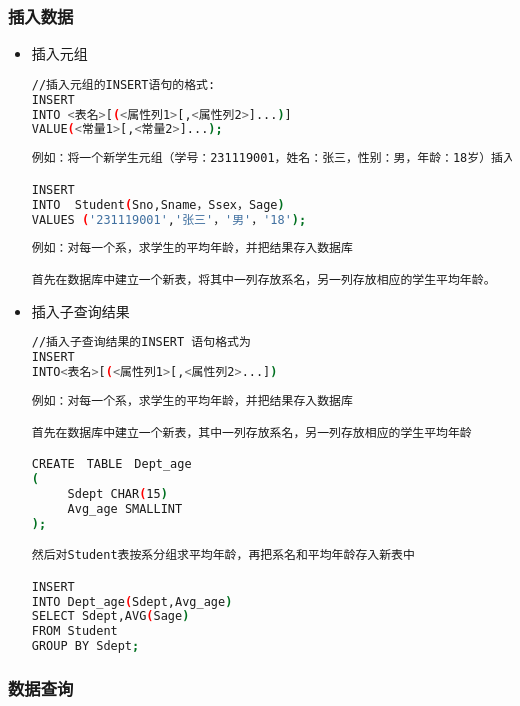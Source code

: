 \subsubsection{插入数据}
\begin{itemize}
\item 插入元组
\begin{lstlisting}[language=bash]
//插入元组的INSERT语句的格式:
INSERT 
INTO <表名>[(<属性列1>[,<属性列2>]...)]
VALUE(<常量1>[,<常量2>]...);
\end{lstlisting}
\begin{lstlisting}[language=bash]
例如：将一个新学生元组（学号：231119001，姓名：张三，性别：男，年龄：18岁）插入到Student表中

INSERT 
INTO  Student(Sno,Sname，Ssex，Sage)
VALUES ('231119001','张三'，'男'，'18');
\end{lstlisting}

\begin{lstlisting}[language=bash]
例如：对每一个系，求学生的平均年龄，并把结果存入数据库

首先在数据库中建立一个新表，将其中一列存放系名，另一列存放相应的学生平均年龄。


\end{lstlisting}
\item 插入子查询结果
\begin{lstlisting}[language=bash]
//插入子查询结果的INSERT 语句格式为
INSERT
INTO<表名>[(<属性列1>[,<属性列2>...])
\end{lstlisting}

\begin{lstlisting}[language=bash]
例如：对每一个系，求学生的平均年龄，并把结果存入数据库

首先在数据库中建立一个新表，其中一列存放系名，另一列存放相应的学生平均年龄

CREATE　TABLE　Dept_age
(
     Sdept CHAR(15)
     Avg_age SMALLINT
);

然后对Student表按系分组求平均年龄，再把系名和平均年龄存入新表中

INSERT 
INTO Dept_age(Sdept,Avg_age)
SELECT Sdept,AVG(Sage)
FROM Student
GROUP BY Sdept;

\end{lstlisting}
\end{itemize}




\subsubsection{数据查询}


